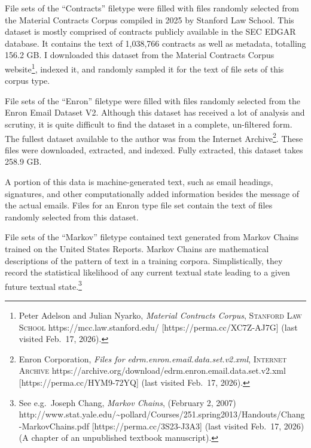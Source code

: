 \documentclass[
]{article}
\begin{document}
File sets of the ``Contracts'' filetype were filled with files randomly
selected from the Material Contracts Corpus compiled in 2025 by Stanford
Law School. This dataset is mostly comprised of contracts publicly
available in the SEC EDGAR database. It contains the text of 1,038,766
contracts as well as metadata, totalling 156.2 GB. I downloaded this
dataset from the Material Contracts Corpus website\footnote{Peter
  Adelson and Julian Nyarko, \emph{Material Contracts Corpus},
  \textsc{Stanford Law School} https://mcc.law.stanford.edu/
  {[}https://perma.cc/XC7Z-AJ7G{]} (last visited Feb.~17, 2026).},
indexed it, and randomly sampled it for the text of file sets of this
corpus type.

File sets of the ``Enron'' filetype were filled with files randomly
selected from the Enron Email Dataset V2. Although this dataset has
received a lot of analysis and scrutiny, it is quite difficult to find
the dataset in a complete, un-filtered form. The fullest dataset
available to the author was from the Internet Archive\footnote{Enron
  Corporation, \emph{Files for edrm.enron.email.data.set.v2.xml},
  \textsc{Internet Archive}
  https://archive.org/download/edrm.enron.email.data.set.v2.xml
  {[}https://perma.cc/HYM9-72YQ{]} (last visited Feb.~17, 2026).}. These
files were downloaded, extracted, and indexed. Fully extracted, this
dataset takes 258.9 GB.

A portion of this data is machine-generated text, such as email
headings, signatures, and other computationally added information
besides the message of the actual emails. Files for an Enron type file
set contain the text of files randomly selected from this dataset.

File sets of the ``Markov'' filetype contained text generated from
Markov Chains trained on the United States Reports. Markov Chains are
mathematical descriptions of the pattern of text in a training corpora.
Simplistically, they record the statistical likelihood of any current
textual state leading to a given future textual state.\footnote{See
  e.g.~Joseph Chang, \emph{Markov Chains}, (February 2, 2007)
  http://www.stat.yale.edu/\textasciitilde pollard/Courses/251.spring2013/Handouts/Chang-MarkovChains.pdf
  {[}https://perma.cc/3S23-J3A3{]} (last visited Feb.~17, 2026) (A
  chapter of an unpublished textbook manuscript).}
\end{document}
